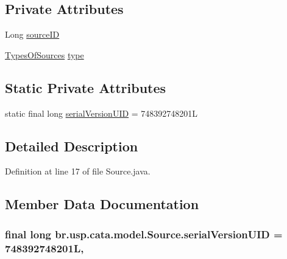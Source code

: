 \subsection*{Private Attributes}
\begin{DoxyCompactItemize}
\item 
Long \hyperlink{classbr_1_1usp_1_1cata_1_1model_1_1_source_a5431dc69303c48300f1933087060eca9}{source\+I\+D}
\item 
\hyperlink{enumbr_1_1usp_1_1cata_1_1model_1_1_types_of_sources}{Types\+Of\+Sources} \hyperlink{classbr_1_1usp_1_1cata_1_1model_1_1_source_af6db8bd36070fd657b6239601089283b}{type}
\end{DoxyCompactItemize}
\subsection*{Static Private Attributes}
\begin{DoxyCompactItemize}
\item 
static final long \hyperlink{classbr_1_1usp_1_1cata_1_1model_1_1_source_a617ac49976bb112d845066732e280fb9}{serial\+Version\+U\+I\+D} = 748392748201\+L
\end{DoxyCompactItemize}


\subsection{Detailed Description}


Definition at line 17 of file Source.\+java.



\subsection{Member Data Documentation}
\hypertarget{classbr_1_1usp_1_1cata_1_1model_1_1_source_a617ac49976bb112d845066732e280fb9}{
\subsubsection[{serial\+Version\+U\+I\+D}]{\setlength{\rightskip}{0pt plus 5cm}final long br.\+usp.\+cata.\+model.\+Source.\+serial\+Version\+U\+I\+D = 748392748201\+L\hspace{0.3cm}{\ttfamily [static]}, {\ttfamily [private]}}}\label{classbr_1_1usp_1_1cata_1_1model_1_1_source_a617ac49976bb112d845066732e280fb9}


